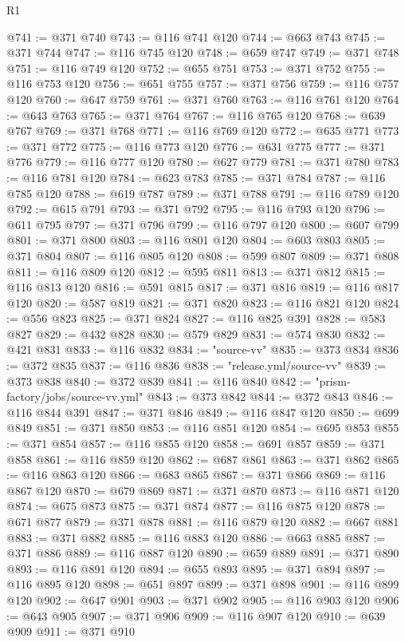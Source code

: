 \begin{lexlean}{R1}
\begin{coremodule}
@741 := @371 @740
@743 := @116 @741 @120
@744 := @663 @743
@745 := @371 @744
@747 := @116 @745 @120
@748 := @659 @747
@749 := @371 @748
@751 := @116 @749 @120
@752 := @655 @751
@753 := @371 @752
@755 := @116 @753 @120
@756 := @651 @755
@757 := @371 @756
@759 := @116 @757 @120
@760 := @647 @759
@761 := @371 @760
@763 := @116 @761 @120
@764 := @643 @763
@765 := @371 @764
@767 := @116 @765 @120
@768 := @639 @767
@769 := @371 @768
@771 := @116 @769 @120
@772 := @635 @771
@773 := @371 @772
@775 := @116 @773 @120
@776 := @631 @775
@777 := @371 @776
@779 := @116 @777 @120
@780 := @627 @779
@781 := @371 @780
@783 := @116 @781 @120
@784 := @623 @783
@785 := @371 @784
@787 := @116 @785 @120
@788 := @619 @787
@789 := @371 @788
@791 := @116 @789 @120
@792 := @615 @791
@793 := @371 @792
@795 := @116 @793 @120
@796 := @611 @795
@797 := @371 @796
@799 := @116 @797 @120
@800 := @607 @799
@801 := @371 @800
@803 := @116 @801 @120
@804 := @603 @803
@805 := @371 @804
@807 := @116 @805 @120
@808 := @599 @807
@809 := @371 @808
@811 := @116 @809 @120
@812 := @595 @811
@813 := @371 @812
@815 := @116 @813 @120
@816 := @591 @815
@817 := @371 @816
@819 := @116 @817 @120
@820 := @587 @819
@821 := @371 @820
@823 := @116 @821 @120
@824 := @556 @823
@825 := @371 @824
@827 := @116 @825 @391
@828 := @583 @827
@829 := @432 @828
@830 := @579 @829
@831 := @574 @830
@832 := @421 @831
@833 := @116 @832
@834 := "source-vv"
@835 := @373 @834
@836 := @372 @835
@837 := @116 @836
@838 := "release.yml/source-vv"
@839 := @373 @838
@840 := @372 @839
@841 := @116 @840
@842 := "prism-factory/jobs/source-vv.yml"
@843 := @373 @842
@844 := @372 @843
@846 := @116 @844 @391
@847 := @371 @846
@849 := @116 @847 @120
@850 := @699 @849
@851 := @371 @850
@853 := @116 @851 @120
@854 := @695 @853
@855 := @371 @854
@857 := @116 @855 @120
@858 := @691 @857
@859 := @371 @858
@861 := @116 @859 @120
@862 := @687 @861
@863 := @371 @862
@865 := @116 @863 @120
@866 := @683 @865
@867 := @371 @866
@869 := @116 @867 @120
@870 := @679 @869
@871 := @371 @870
@873 := @116 @871 @120
@874 := @675 @873
@875 := @371 @874
@877 := @116 @875 @120
@878 := @671 @877
@879 := @371 @878
@881 := @116 @879 @120
@882 := @667 @881
@883 := @371 @882
@885 := @116 @883 @120
@886 := @663 @885
@887 := @371 @886
@889 := @116 @887 @120
@890 := @659 @889
@891 := @371 @890
@893 := @116 @891 @120
@894 := @655 @893
@895 := @371 @894
@897 := @116 @895 @120
@898 := @651 @897
@899 := @371 @898
@901 := @116 @899 @120
@902 := @647 @901
@903 := @371 @902
@905 := @116 @903 @120
@906 := @643 @905
@907 := @371 @906
@909 := @116 @907 @120
@910 := @639 @909
@911 := @371 @910

\end{coremodule}
\end{lexlean}
